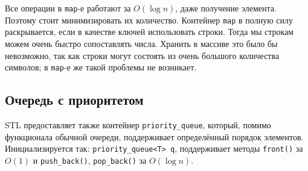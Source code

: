 Все операции в \texttt{map}-е работают за $O(\log n)$, даже получение элемента. Поэтому стоит минимизировать их количество. Контейнер \texttt{map} в полную силу раскрывается, если в качестве ключей использовать строки. Тогда мы строкам можем очень быстро сопоставлять числа. Хранить в массиве это было бы невозможно, так как строки могут состоять из очень большого количества символов; в \texttt{map}-е же такой проблемы не возникает.


\subsection{Очередь с приоритетом}

STL предоставляет также контейнер \texttt{priority\_queue}, который, помимо функционала обычной очереди, поддерживает определённый порядок элементов. Инициализируется так: \texttt{priority\_queue<T> q}, поддерживает методы \texttt{front()} за $O(1)$ и \texttt{push\_back()}, \texttt{pop\_back()} за $O(\log n)$.

